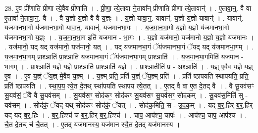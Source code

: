 \documentclass[17pt]{extarticle}
\begin{document}
28. ए॒व प्री॑णाति प्रीणा त्ये॒वैव प्री॑णाति । . प्री॒णा॒ त्ये॒तावा॑ ने॒तावा᳚न् प्रीणाति प्रीणा त्ये॒तावान्॑ । . ए॒तावा॒न्॒. वै वा ए॒तावा॑ ने॒तावा॒न्॒. वै । . वै य॒ज्ञो य॒ज्ञो वै वै य॒ज्ञ्ः । . य॒ज्ञो यावा॒न्॒. यावान्॑. य॒ज्ञो य॒ज्ञो यावान्॑ । . यावान्॑. यजमानभा॒गो य॑जमानभा॒गो यावा॒न्॒. यावान्॑. यजमानभा॒गः । . य॒ज॒मा॒न॒भा॒गो य॒ज्ञो य॒ज्ञो य॑जमानभा॒गो य॑जमानभा॒गो य॒ज्ञ्ः । . य॒ज॒मा॒न॒भा॒ग इति॑ यजमान - भा॒गः । . य॒ज्ञो यज॑मानो॒ यज॑मानो य॒ज्ञो य॒ज्ञो यज॑मानः । . यज॑मानो॒ यद् यद् यज॑मानो॒ यज॑मानो॒ यत् । . यद् य॑जमानभा॒गं ॅय॑जमानभा॒गं ॅयद् यद् य॑जमानभा॒गम् । . य॒ज॒मा॒न॒भा॒गम् प्रा॒श्ञाति॑ प्रा॒श्ञाति॑ यजमानभा॒गं ॅय॑जमानभा॒गम् प्रा॒श्ञाति॑ । . य॒ज॒मा॒न॒भा॒गमिति॑ यजमान - भा॒गम् । . प्रा॒श्ञाति॑ य॒ज्ञे य॒ज्ञे प्रा॒श्ञाति॑ प्रा॒श्ञाति॑ य॒ज्ञे । . प्रा॒श्ञातीति॑ प्र - अ॒श्ञाति॑ । . य॒ज्ञ् ए॒वैव य॒ज्ञे य॒ज्ञ् ए॒व । . ए॒व य॒ज्ञ्ं ॅय॒ज्ञ् मे॒वैव य॒ज्ञ्म् । . य॒ज्ञ्म् प्रति॒ प्रति॑ य॒ज्ञ्ं ॅय॒ज्ञ्म् प्रति॑ । . प्रति॑ ष्ठापयति स्थापयति॒ प्रति॒ प्रति॑ ष्ठापयति । . स्था॒प॒य॒ त्ये॒त दे॒तथ् स्था॑पयति स्थापय त्ये॒तत् । . ए॒तद् वै वा ए॒त दे॒तद् वै । . वै सू॒यव॑सꣳ सू॒यव॑सं॒ ॅवै वै सू॒यव॑सम् । . सू॒यव॑सꣳ॒॒ सोद॑कꣳ॒॒ सोद॑कꣳ सू॒यव॑सꣳ सू॒यव॑सꣳ॒॒ सोद॑कम् । . सू॒यव॑स॒मिति॑ सु - यव॑सम् । . सोद॑कं॒ ॅयद् यथ् सोद॑कꣳ॒॒ सोद॑कं॒ ॅयत् । . सोद॑क॒मिति॒ स - उ॒द॒क॒म् । . यद् ब॒र्॒.हिर् ब॒र्॒.हिर् यद् यद् ब॒र्॒.हिः । . ब॒र्॒.हिश्च॑ च ब॒र्॒.हिर् ब॒र्॒.हिश्च॑ । . चाप॒ आप॑श्च॒ चापः॑ । . आप॑श्च॒ चाप॒ आप॑श्च । . चै॒त दे॒तच् च॑ चै॒तत् । . ए॒तद् यज॑मानस्य॒ यज॑मान स्यै॒त दे॒तद् यज॑मानस्य । \newline
\end{document}
